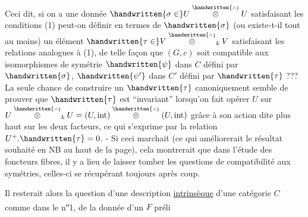 Ceci dit, si on a une donnée $\handwritten{\sigma\in}U\overset{\handwritten{\scriptscriptstyle\wedge}}{\otimes} U$ satisfaisant les conditions (1) peut-on définir en termes de $\handwritten{\sigma}$ (ou existe-t-il tout au moins) un élément $\handwritten{\tau\in}V\overset{\handwritten{\scriptscriptstyle\wedge}}{\otimes}_k V$ satisfaisant les relations analogues à (1), de telle façon que $(G,c)$ soit compatible aux isomorphismes de symétrie $\handwritten{\psi}$ dans $C$ défini par $\handwritten{\sigma}$, $\handwritten{\psi'}$ dans $C'$ défini par $\handwritten{\tau}$ ??? La seule chance de  construire un $\handwritten{\tau}$ canoniquement semble de prouver que $\handwritten{\tau}$ est ``invariant'' lorsqu'on fait opérer $U$ sur $U\overset{\handwritten{\scriptscriptstyle\wedge}}{\otimes}_k U=(U,\mathrm{int})\overset{\handwritten{\scriptscriptstyle\wedge}}{\otimes}(U,\mathrm{int})$ grâce à son action dite plus haut sur les deux facteurs, ce qui s'exprime par la relation $U^+ .\handwritten{\tau}=0$. - Si ceci marchait (ce qui améliorerait le résultat souhaité en NB au haut de la page), cela montrerait que dans l'étude des foncteurs fibres, il y a lieu de laisser tomber les questions de compatibilité aux symétries, celles-ci se récupérant toujours après coup.

Il resterait alors la question d'une description \uline{intrinsèque} d'une catégorie $C$ comme dans le n\textsuperscript{o}1,  de la donnée d'un $F$ préli%
